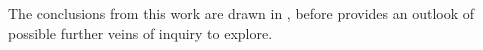 The conclusions from this work are drawn in , before  provides an outlook of possible further veins of inquiry to explore.





